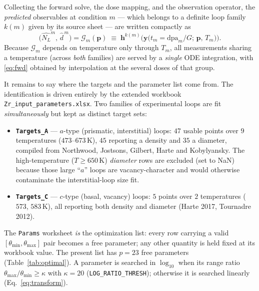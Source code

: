 \documentclass{article}
\newcommand{\param}{\bm{p}}
\newcommand{\dpa}{\mathrm{dpa}}
\newcommand{\NL}{N_{L}}
\begin{document}
Collecting the forward solve, the dose mapping, and the observation operator, the
\emph{predicted} observables at condition $m$ --- which belongs to a definite
loop family $k(m)$ given by its source sheet --- are written compactly as
\begin{equation}
  \big(\widehat{\NL}^{m},\,\widehat{d}^{\,m}\big)
  =\mathcal{G}_m(\param)
  \;\equiv\;
  \bm{h}^{k(m)}\!\Big(\bm{y}\big(t_m=\dpa_m/G;\,\param,\,T_m\big)\Big).
  \label{eq:fwd}
\end{equation}
Because $\mathcal{G}_m$ depends on temperature only through $T_m$, all
measurements sharing a temperature (across \emph{both} families) are served by a
\emph{single} ODE integration, with \eqref{eq:fwd} obtained by interpolation at
the several doses of that group.

\label{sec:input}%
It remains to say where the targets and the parameter list come from.
The identification is driven entirely by the extended workbook
\texttt{Zr\_input\_parameters.xlsx}. Two families of experimental loops are fit
\emph{simultaneously} but kept as distinct target sets:
\begin{itemize}\itemsep2pt
\item \textbf{\texttt{Targets\_A}} --- $a$-type (prismatic, interstitial) loops:
$47$ usable points over $9$ temperatures ($473$--$673\,$K), $45$ reporting a
density and $35$ a diameter, compiled from Northwood, Jostsons, Gilbert, Harte
and Kobylyansky. The high-temperature ($T\!\ge\!650\,$K) \emph{diameter} rows are
excluded (set to NaN) because those large ``$a$'' loops are vacancy-character
and would otherwise contaminate the interstitial-loop size fit.
\item \textbf{\texttt{Targets\_C}} --- $c$-type (basal, vacancy) loops: $5$ points
over $2$ temperatures ($573$, $583\,$K), all reporting both density and diameter
(Harte 2017, Tournadre 2012).
\end{itemize}
The \texttt{Params} worksheet \emph{is} the optimization list: every row carrying
a valid $[\theta_{\min},\theta_{\max}]$ pair becomes a free parameter; any other
quantity is held fixed at its workbook value. The present list has $p=23$ free
parameters (Table~\ref{tab:optimal}). A parameter is searched in $\log_{10}$ when
its range ratio $\theta_{\max}/\theta_{\min}\ge\kappa$ with $\kappa=20$
(\texttt{LOG\_RATIO\_THRESH}); otherwise it is searched linearly
(Eq.~\eqref{eq:transform}).
\end{document}
